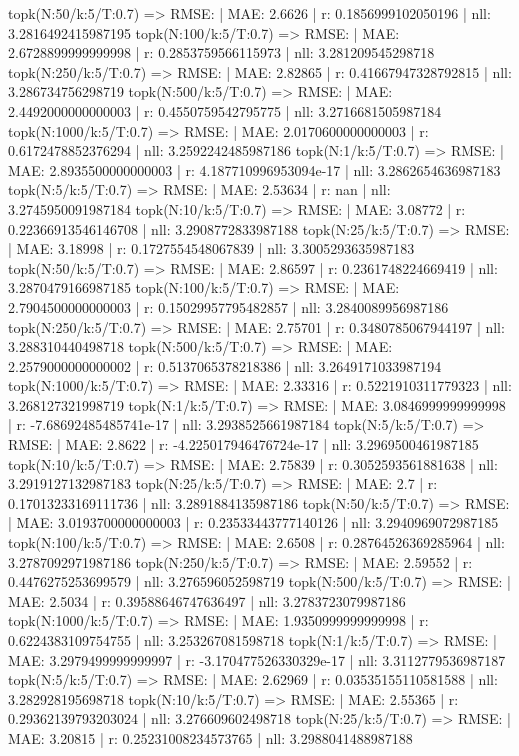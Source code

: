 topk(N:50/k:5/T:0.7) => RMSE: | MAE: 2.6626 | r: 0.1856999102050196 | nll: 3.2816492415987195
topk(N:100/k:5/T:0.7) => RMSE: | MAE: 2.6728899999999998 | r: 0.2853759566115973 | nll: 3.281209545298718
topk(N:250/k:5/T:0.7) => RMSE: | MAE: 2.82865 | r: 0.41667947328792815 | nll: 3.286734756298719
topk(N:500/k:5/T:0.7) => RMSE: | MAE: 2.4492000000000003 | r: 0.4550759542795775 | nll: 3.2716681505987184
topk(N:1000/k:5/T:0.7) => RMSE: | MAE: 2.0170600000000003 | r: 0.6172478852376294 | nll: 3.2592242485987186
topk(N:1/k:5/T:0.7) => RMSE: | MAE: 2.8935500000000003 | r: 4.187710996953094e-17 | nll: 3.2862654636987183
topk(N:5/k:5/T:0.7) => RMSE: | MAE: 2.53634 | r: nan | nll: 3.2745950091987184
topk(N:10/k:5/T:0.7) => RMSE: | MAE: 3.08772 | r: 0.22366913546146708 | nll: 3.2908772833987188
topk(N:25/k:5/T:0.7) => RMSE: | MAE: 3.18998 | r: 0.1727554548067839 | nll: 3.3005293635987183
topk(N:50/k:5/T:0.7) => RMSE: | MAE: 2.86597 | r: 0.2361748224669419 | nll: 3.2870479166987185
topk(N:100/k:5/T:0.7) => RMSE: | MAE: 2.7904500000000003 | r: 0.15029957795482857 | nll: 3.2840089956987186
topk(N:250/k:5/T:0.7) => RMSE: | MAE: 2.75701 | r: 0.3480785067944197 | nll: 3.288310440498718
topk(N:500/k:5/T:0.7) => RMSE: | MAE: 2.2579000000000002 | r: 0.5137065378218386 | nll: 3.2649171033987194
topk(N:1000/k:5/T:0.7) => RMSE: | MAE: 2.33316 | r: 0.5221910311779323 | nll: 3.268127321998719
topk(N:1/k:5/T:0.7) => RMSE: | MAE: 3.0846999999999998 | r: -7.68692485485741e-17 | nll: 3.2938525661987184
topk(N:5/k:5/T:0.7) => RMSE: | MAE: 2.8622 | r: -4.225017946476724e-17 | nll: 3.2969500461987185
topk(N:10/k:5/T:0.7) => RMSE: | MAE: 2.75839 | r: 0.3052593561881638 | nll: 3.2919127132987183
topk(N:25/k:5/T:0.7) => RMSE: | MAE: 2.7 | r: 0.17013233169111736 | nll: 3.2891884135987186
topk(N:50/k:5/T:0.7) => RMSE: | MAE: 3.0193700000000003 | r: 0.23533443777140126 | nll: 3.2940969072987185
topk(N:100/k:5/T:0.7) => RMSE: | MAE: 2.6508 | r: 0.28764526369285964 | nll: 3.2787092971987186
topk(N:250/k:5/T:0.7) => RMSE: | MAE: 2.59552 | r: 0.4476275253699579 | nll: 3.276596052598719
topk(N:500/k:5/T:0.7) => RMSE: | MAE: 2.5034 | r: 0.39588646747636497 | nll: 3.2783723079987186
topk(N:1000/k:5/T:0.7) => RMSE: | MAE: 1.9350999999999998 | r: 0.6224383109754755 | nll: 3.253267081598718
topk(N:1/k:5/T:0.7) => RMSE: | MAE: 3.2979499999999997 | r: -3.170477526330329e-17 | nll: 3.3112779536987187
topk(N:5/k:5/T:0.7) => RMSE: | MAE: 2.62969 | r: 0.03535155110581588 | nll: 3.282928195698718
topk(N:10/k:5/T:0.7) => RMSE: | MAE: 2.55365 | r: 0.29362139793203024 | nll: 3.276609602498718
topk(N:25/k:5/T:0.7) => RMSE: | MAE: 3.20815 | r: 0.25231008234573765 | nll: 3.2988041488987188
